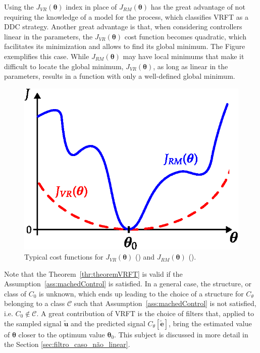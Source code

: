 Using the $J_{VR}(\bm{\theta})$ index in place of $J_{RM}(\bm{\theta})$ has the great advantage of not requiring the knowledge of a model for the process, which classifies VRFT as a DDC strategy. Another great advantage is that, when considering controllers linear in the parameters, the $J_{VR}(\bm{\theta})$ cost function becomes quadratic, which facilitates its minimization and allows to find its global minimum. The Figure  exemplifies this case. While $J_{RM}(\bm{\theta})$ may have local minimums that make it difficult to locate the global minimum, $J_{VR}(\bm{\theta})$, as long as linear in the parameters, results in a function with only a well-defined global minimum.
\begin{figure}[htpb]
    
   \centering
   \includegraphics{Figs/JVR_JRM_plot.eps}
   \caption{Typical cost functions for $J_{VR}(\bm{\theta})$ () and $J_{RM}(\bm{\theta})$ ().}
   \label{fig:JVR_JRM_plot}
\end{figure}

Note that the Theorem~\ref{thr:theoremVRFT} is valid if the Assumption~\ref{ass:machedControl} is satisfied. In a general case, the structure, or class of $C_0$ is unknown, which ends up leading to the choice of a structure for $C_\theta$ belonging to a class $\mathscr{C}$ such that Assumption~\ref{ass:machedControl} is not satisfied, i.e. $C_0 \notin \mathscr{C} $.
A great contribution of VRFT is the choice of filters that, applied to the sampled signal $\tilde{\bm{u}}$ and the predicted signal $C_\theta[\tilde{\bm{e}}]$, bring the estimated value of $\bm{\theta}$ closer to the optimum value $\bm{\theta}_0$. This subject is discussed in more detail in the Section \ref{sec:filtro_caso_não_linear}.

